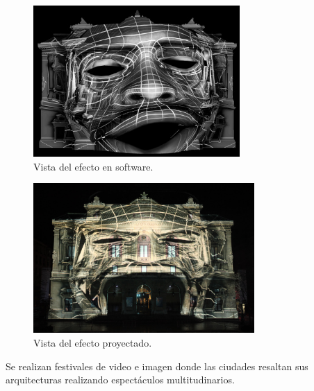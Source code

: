 \begin{minipage}{0.50\textwidth}
\begin{flushleft} \large
\begin{figure}[H]
  \centering
    \includegraphics[width=0.7\textwidth]{./Cap1_intro/celestin_head.jpg}
  \caption[http://mappingvideo.blogspot.com/]{Vista del efecto en software.}
  \label{fig:Efecto1}
\end{figure}
\end{flushleft}
\end{minipage}
\begin{minipage}{0.50\textwidth}
\begin{flushright} \large
\begin{figure}[H]
  \centering
    \includegraphics[width=0.75\textwidth]{./Cap1_intro/realcelestins_headshot.jpg}
  \caption[http://mappingvideo.blogspot.com/]{Vista del efecto proyectado.}
  \label{fig:Efecto2}
\end{figure}
\end{flushright}
\end{minipage}


Se realizan festivales de video e imagen donde las ciudades resaltan sus arquitecturas realizando espectáculos multitudinarios.

